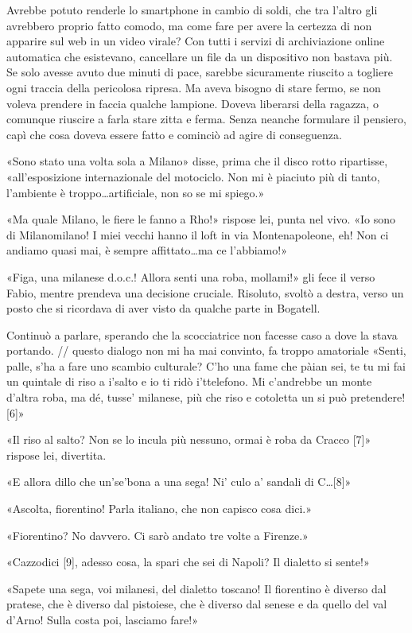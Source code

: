 Avrebbe potuto renderle lo smartphone in cambio di soldi, che tra l'altro gli avrebbero proprio fatto comodo, ma come fare per avere la certezza di non apparire sul web in un video virale? Con tutti i servizi di archiviazione online automatica che esistevano, cancellare un file da un dispositivo non bastava più. Se solo avesse avuto due minuti di pace, sarebbe sicuramente riuscito a togliere ogni traccia della pericolosa ripresa. Ma aveva bisogno di stare fermo, se non voleva prendere in faccia qualche lampione. Doveva liberarsi della ragazza, o comunque riuscire a farla stare zitta e ferma. Senza neanche formulare il pensiero, capì che cosa doveva essere fatto e cominciò ad agire di conseguenza.

«Sono stato una volta sola a Milano» disse, prima che il disco rotto ripartisse, «all'esposizione internazionale del motociclo. Non mi è piaciuto più di tanto, l'ambiente è troppo\ldots artificiale, non so se mi spiego.»

«Ma quale Milano, le fiere le fanno a Rho!» rispose lei, punta nel vivo. «Io sono di Milanomilano! I miei vecchi hanno il loft in via Montenapoleone, eh! Non ci andiamo quasi mai, è sempre affittato\ldots ma ce l'abbiamo!»

«Figa, una milanese d.o.c.! Allora senti una roba, mollami!» gli fece il verso Fabio, mentre prendeva una decisione cruciale. Risoluto, svoltò a destra, verso un posto che si ricordava di aver visto da qualche parte in Bogatell.

Continuò a parlare, sperando che la scocciatrice non facesse caso a dove la stava portando.
// questo dialogo non mi ha mai convinto, fa troppo amatoriale
«Senti, palle, s'ha a fare uno scambio culturale? C'ho una fame che pàian sei, te tu mi fai un quintale di riso a i'salto e io ti ridò i'ttelefono. Mi c'andrebbe un monte d'altra roba, ma dé, tusse' milanese, più che riso e cotoletta un si può pretendere! [6]»

«Il riso al salto? Non se lo incula più nessuno, ormai è roba da Cracco [7]» rispose lei, divertita.

«E allora dillo che un'se'bona a una sega! Ni' culo a' sandali di C\ldots [8]»

«Ascolta, fiorentino! Parla italiano, che non capisco cosa dici.»

«Fiorentino? No davvero. Ci sarò andato tre volte a Firenze.»

«Cazzodici [9], adesso cosa, la spari che sei di Napoli? Il dialetto si sente!»

«Sapete una sega, voi milanesi, del dialetto toscano! Il fiorentino è diverso dal pratese, che è diverso dal pistoiese, che è diverso dal senese e da quello del val d'Arno! Sulla costa poi, lasciamo fare!»

